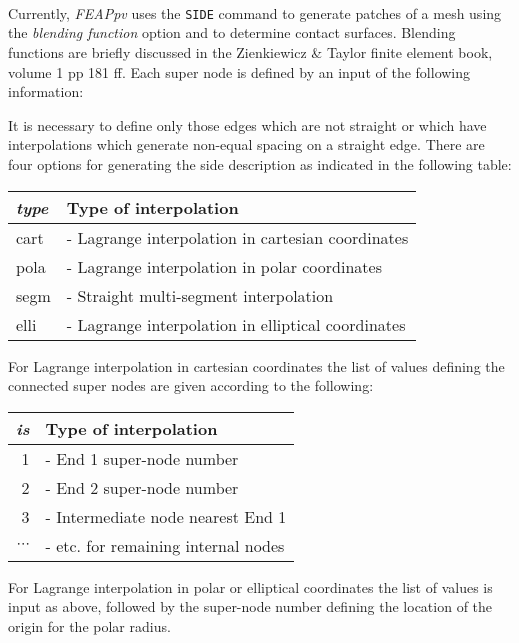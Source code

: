  \\{\smallskip}
 \\{\smallskip}
 \\{\smallskip}
\headb

Currently, {\sl FEAPpv} uses the
{\tt SIDE} command to generate patches of a mesh using the {\it blending
function} option and to determine contact surfaces.
Blending functions are briefly discussed in the
Zienkiewicz \& Taylor finite element book, volume 1 pp 181 ff.  Each
super node is defined by an input of the following information:

It is necessary to define only those edges which are not straight or which
have interpolations which generate non-equal spacing on a straight edge.
There are four options for generating the side description as indicated
in the following table:

\begin{center}
\begin{tabular}{l l}
\it type     & \qquad Type of interpolation \\ \hline
    cart     &  - Lagrange interpolation in cartesian coordinates \\
    pola     &  - Lagrange interpolation in polar coordinates \\
    segm     &  - Straight multi-segment interpolation \\
    elli     &  - Lagrange interpolation in elliptical coordinates
\end{tabular}
\end{center}
For Lagrange interpolation in cartesian coordinates the list of values
defining the connected super nodes are given according to the following:

\begin{center}
\begin{tabular}{r l}
\it  is     & \qquad Type of interpolation \\ \hline
      1     &  - End 1 super-node number \\
      2     &  - End 2 super-node number \\
      3     &  - Intermediate node nearest End 1 \\
  $\cdots$  &  - etc. for remaining internal nodes
\end{tabular}
\end{center}
For Lagrange interpolation in polar or elliptical coordinates the list of values
is input as above, followed by the super-node number defining the
location of the origin for the polar radius.


